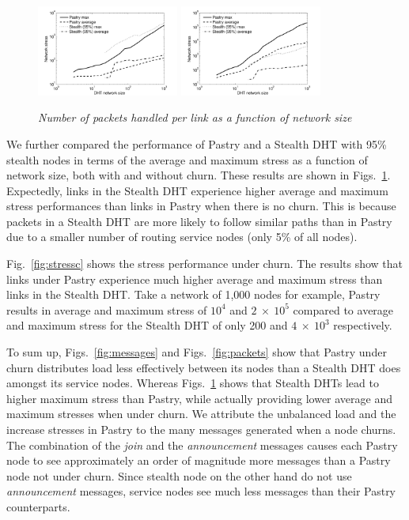 \documentclass[letterpaper]{sig-alternate} %
\begin{document}
\begin{figure}[tb]\centering
\center {}%
    {\includegraphics[width=0.415\textwidth]{./diagrams/stress}
    \label{fig:stressnc}}
    {\includegraphics[width=0.415\textwidth]{./diagrams/stress_churn}
    \label{fig:stressc}}
\caption{\em Number of packets handled per link as a function of
network size} \label{fig:stress}
\end{figure}

We further compared the performance of Pastry and a Stealth DHT with
95\% stealth nodes in terms of the average and maximum stress as a
function of network size, both with and without churn. These results
are shown in Figs.~\ref{fig:stress}. Expectedly, links in the
Stealth DHT experience higher average and maximum  stress
performances than links in Pastry when there is no churn. This is
because packets in a Stealth DHT are more likely to follow  similar
paths than in Pastry due to a smaller number of routing service
nodes (only 5\% of all nodes).

Fig.~\ref{fig:stressc} shows the stress performance under churn. The
results show that links under Pastry experience much higher average and
maximum stress than links in the Stealth DHT. Take a network of 1,000
nodes for example, Pastry results in average and maximum stress of
$10^4$ and $2~\times~10^5$ compared to average and maximum stress for
the Stealth DHT of only 200 and $4~\times~10^3$ respectively.

To sum up, Figs.~\ref{fig:messages} and Figs.~\ref{fig:packets} show
that Pastry under churn distributes load less effectively between its
nodes than a Stealth DHT does amongst its service nodes. Whereas
Figs.~\ref{fig:stress} shows that Stealth DHTs lead to higher maximum
stress than Pastry, while actually providing lower average and maximum
stresses when under churn. We attribute the unbalanced load and the
increase stresses in Pastry to the many messages generated when a node
churns. The combination of the \emph{join} and the \emph{announcement}
messages causes each Pastry node to see approximately an order of
magnitude more messages than a Pastry node not under churn. Since
stealth node on the other hand do not use \emph{announcement} messages,
service nodes see much less messages than their Pastry counterparts.
\end{document}
